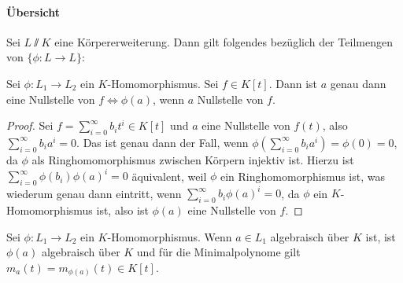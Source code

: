 \documentclass[12pt,a4paper]{scrartcl}
\begin{document}
\paragraph{Übersicht} Sei $L\sslash K$ eine Körpererweiterung. Dann gilt folgendes bezüglich der Teilmengen von $\{\phi\colon L\to L\}$:

\begin{center}
\end{center}

\begin{lem}\label{lem:khomonst}
	Sei $\phi\colon L_1\to L_2$ ein $K$-Homomorphismus. Sei $f\in K[t]$. Dann ist $a$ genau dann eine Nullstelle von $f\Leftrightarrow \phi(a)$, wenn $a$ Nullstelle von $f$.
\end{lem}
\begin{proof}
Sei $f = \sum_{i = 0}^{\infty}b_it^i\in K[t]$ und $a$ eine Nullstelle von $f(t)$, also $\sum_{i = 0}^{\infty}b_ia^i = 0$. Das ist genau dann der Fall, wenn $\phi(\sum_{i = 0}^{\infty}b_ia^i) = \phi(0) = 0$, da $\phi$ als Ringhomomorphismus zwischen Körpern injektiv ist. Hierzu ist $\sum_{i = 0}^{\infty}	\phi(b_i)\phi(a)^i = 0$ äquivalent,  weil $\phi$ ein Ringhomomorphismus ist, was wiederum genau dann eintritt, wenn
$\sum_{i = 0}^{\infty}b_i\phi(a)^i =0$, da $\phi$ ein $K$-Homomorphismus ist, also ist $\phi(a)$ eine Nullstelle von $f$.
\end{proof}



\begin{lem}
	Sei $\phi\colon L_1\to L_2$ ein $K$-Homomorphismus. Wenn $a\in L_1$ algebraisch über $K$ ist, ist $\phi(a)$ algebraisch über $K$ und für die Minimalpolynome gilt $m_a(t) = m_{\phi(a)}(t)\in K[t]$.
\end{lem}
\end{document}
